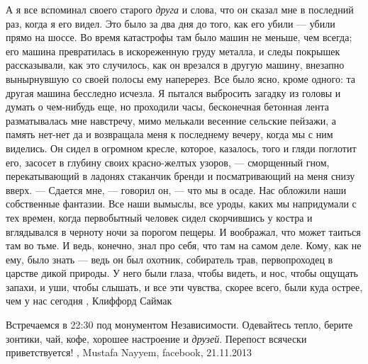 А я все вспоминал своего старого \emph{друга} и слова, что он сказал мне в последний
раз, когда я его видел. Это было за два дня до того, как его убили — убили
прямо на шоссе. Во время катастрофы там было машин не меньше, чем всегда; его
машина превратилась в искореженную груду металла, и следы покрышек
рассказывали, как это случилось, как он врезался в другую машину, внезапно
вынырнувшую со своей полосы ему наперерез. Все было ясно, кроме одного: та
другая машина бесследно исчезла.  Я пытался выбросить загадку из головы и
думать о чем-нибудь еще, но проходили часы, бесконечная бетонная лента
разматывалась мне навстречу, мимо мелькали весенние сельские пейзажи, а память
нет-нет да и возвращала меня к последнему вечеру, когда мы с ним виделись.  Он
сидел в огромном кресле, которое, казалось, того и гляди поглотит его, засосет
в глубину своих красно-желтых узоров, — сморщенный гном, перекатывающий в
ладонях стаканчик бренди и посматривающий на меня снизу вверх.  — Сдается мне,
— говорил он, — что мы в осаде. Нас обложили наши собственные фантазии.  Все
наши вымыслы, все уроды, каких мы напридумали с тех времен, когда первобытный
человек сидел скорчившись у костра и вглядывался в черноту ночи за порогом
пещеры. И воображал, что может таиться там во тьме. И ведь, конечно, знал про
себя, что там на самом деле. Кому, как не ему, было знать — ведь он был
охотник, собиратель трав, первопроходец в царстве дикой природы. У него были
глаза, чтобы видеть, и нос, чтобы ощущать запахи, и уши, чтобы слышать, и все
эти чувства, скорее всего, были куда острее, чем у нас сегодня
, Клиффорд Саймак

Встречаемся в 22:30 под монументом Независимости. Одевайтесь тепло, берите
зонтики, чай, кофе, хорошее настроение и \emph{друзей}. Перепост всячески
приветствуется!
, Mustafa Nayyem, facebook, %
21.11.2013%
